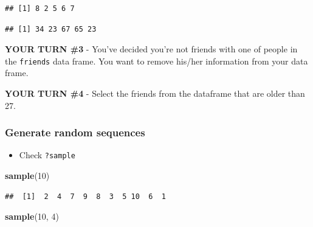 \documentclass[
]{article}
\newenvironment{Shaded}{\begin{snugshade}}{\end{snugshade}}
\newcommand{\CommentTok}[1]{\textcolor[rgb]{0.56,0.35,0.01}{\textit{#1}}}
\newcommand{\DecValTok}[1]{\textcolor[rgb]{0.00,0.00,0.81}{#1}}
\newcommand{\KeywordTok}[1]{\textcolor[rgb]{0.13,0.29,0.53}{\textbf{#1}}}
\newcommand{\NormalTok}[1]{#1}
\newcommand{\OperatorTok}[1]{\textcolor[rgb]{0.81,0.36,0.00}{\textbf{#1}}}
\providecommand{\tightlist}{%
  \setlength{\itemsep}{0pt}\setlength{\parskip}{0pt}}
\begin{document}
\begin{Shaded}
\end{Shaded}

\begin{verbatim}
## [1] 8 2 5 6 7
\end{verbatim}

\begin{Shaded}
\end{Shaded}

\begin{verbatim}
## [1] 34 23 67 65 23
\end{verbatim}

\textbf{YOUR TURN \#3} - You've decided you're not friends with one of
people in the \texttt{friends} data frame. You want to remove his/her
information from your data frame.

\textbf{YOUR TURN \#4} - Select the friends from the dataframe that are
older than 27.

\hypertarget{generate-random-sequences}{%
\subsubsection{Generate random
sequences}\label{generate-random-sequences}}

\begin{itemize}
\tightlist
\item
  Check \texttt{?sample}
\end{itemize}

\begin{Shaded}
\begin{Highlighting}[]
\KeywordTok{sample}\NormalTok{(}\DecValTok{10}\NormalTok{)}
\end{Highlighting}
\end{Shaded}

\begin{verbatim}
##  [1]  2  4  7  9  8  3  5 10  6  1
\end{verbatim}

\begin{Shaded}
\begin{Highlighting}[]
\KeywordTok{sample}\NormalTok{(}\DecValTok{10}\NormalTok{, }\DecValTok{4}\NormalTok{)}
\end{Highlighting}
\end{Shaded}
\end{document}
